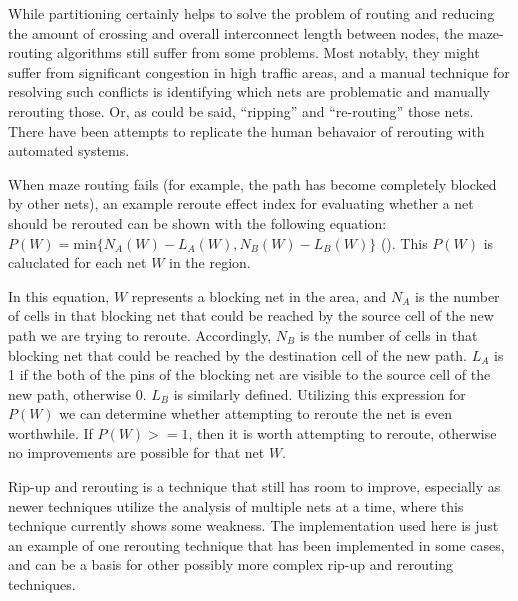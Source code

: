 
While partitioning certainly helps to solve the problem
of routing and reducing the amount of crossing and overall
interconnect length between nodes, the maze-routing
algorithms still suffer from some problems. Most notably,
they might suffer from significant congestion in high
traffic areas, and a manual technique for resolving
such conflicts is identifying which nets are problematic
and manually rerouting those. Or, as could be said,
``ripping'' and ``re-routing'' those nets. There have
been attempts to replicate the human behavaior of rerouting
with automated systems.

When maze routing fails (for example, the path has become
completely blocked by other nets), an example reroute
effect index for evaluating whether a net should be
rerouted can be shown with the following equation: $P(W)
= \text{min} \{N_A(W) - L_A(W), N_B(W) - L_B(W)\}$ (\cite{52212}).
This $P(W)$ is caluclated for each net $W$ in the region.

In this equation, $W$ represents a blocking net in the
area, and $N_A$ is the number of cells in that blocking
net that could be reached by the source cell of the
new path we are trying to reroute. Accordingly, $N_B$
is the number of cells in that blocking net that could
be reached by the destination cell of the new path.
$L_A$ is 1 if the both of the pins of the blocking net
are visible to the source cell of the new path, otherwise
0. $L_B$ is similarly defined. Utilizing this expression
for $P(W)$ we can determine whether attempting to reroute
the net is even worthwhile. If $P(W) >= 1$, then it
is worth attempting to reroute, otherwise no improvements
are possible for that net $W$.

Rip-up and rerouting is a technique that still has room
to improve, especially as newer techniques utilize the
analysis of multiple nets at a time, where this technique
currently shows some weakness. The implementation used here
is just an example of one rerouting technique that has
been implemented in some cases, and can be a basis for other
possibly more complex rip-up and rerouting techniques.
